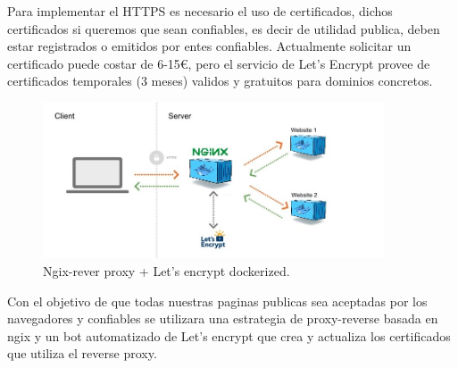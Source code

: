 Para implementar el HTTPS es necesario el uso de certificados, dichos certificados si queremos que sean confiables, es decir de utilidad publica, deben estar registrados o emitidos por entes confiables. Actualmente solicitar un certificado puede costar de 6-15€, pero el servicio de Let's Encrypt\cite{c_letsencrypt} provee de certificados temporales (3 meses) validos y gratuitos para dominios concretos.

\begin{figure}[!htb]
\begin{center}
\includegraphics[width=0.9\textwidth]{./figuras/webproxy}
\caption{Ngix-rever proxy + Let's encrypt dockerized\cite{i_ngix_proxy}.}
\label{F:webproxy}
\end{center}
\end{figure}

Con el objetivo de que todas nuestras paginas publicas sea aceptadas por los navegadores y confiables se utilizara una estrategia de proxy-reverse basada en ngix y un bot automatizado de Let's encrypt que crea y actualiza los certificados que utiliza el reverse proxy.

